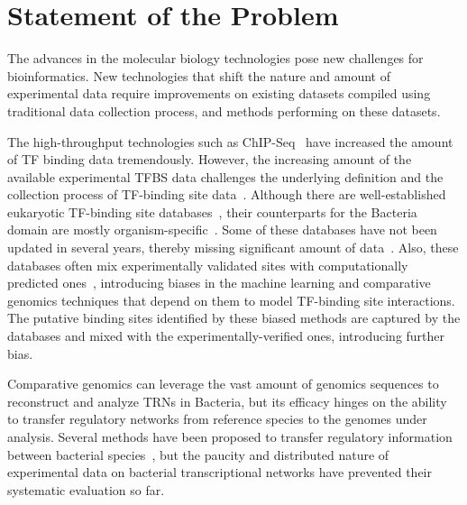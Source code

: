 \section{Statement of the Problem}

The advances in the molecular biology technologies pose new challenges for
bioinformatics. New technologies that shift the nature and amount of
experimental data require improvements on existing datasets compiled using
traditional data collection process, and methods performing on these datasets.

The high-throughput technologies such as ChIP-Seq~\citep{bailey2013practical}
have increased the amount of TF binding data tremendously. However, the
increasing amount of the available experimental TFBS data challenges the
underlying definition and the collection process of TF-binding site
data~\citep{salgado2013regulondb}. Although there are well-established
eukaryotic TF-binding site databases~\citep{mathelier2015jaspar,
  matys2003transfac}, their counterparts for the Bacteria domain are mostly
organism-specific~\citep{salgado2013regulondb, sierro2008dbtbs,
  jacques2005mtbreglist, pauling2012coryneregnet}. Some of these databases have
not been updated in several years, thereby missing significant amount of
data~\citep{munch2003prodoric}. Also, these databases often mix experimentally
validated sites with computationally predicted
ones~\citep{kazakov2007regtransbase}, introducing biases in the machine learning
and comparative genomics techniques that depend on them to model TF-binding
site interactions. The putative binding sites identified by
these biased methods are captured by the databases and mixed with the
experimentally-verified ones, introducing further bias.

Comparative genomics can leverage the vast amount of genomics sequences to
reconstruct and analyze TRNs in Bacteria, but its efficacy hinges on the
ability to transfer regulatory networks from reference species to the genomes
under analysis. Several methods have been proposed to transfer regulatory
information between bacterial species~\citep{babu2009methods,
  baumbach2010power}, but the paucity and distributed nature of experimental
data on bacterial transcriptional networks have prevented their systematic
evaluation so far.


